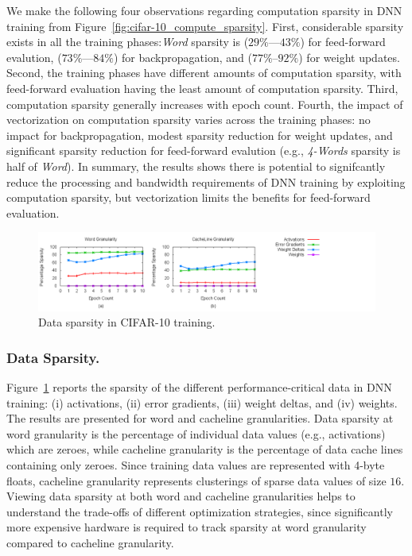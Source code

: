 We make the following four observations regarding computation sparsity in DNN training from Figure~\ref{fig:cifar-10_compute_sparsity}.  First, considerable sparsity exists in all the training phases:{\it Word} sparsity is ($29\%$---$43\%$) for feed-forward evalution, ($73\%$---$84\%$) for backpropagation, and ($77\%$--$92\%$) for weight updates.   Second, the training phases have different amounts of computation sparsity, with feed-forward evaluation having the least amount of computation sparsity. Third, computation sparsity generally increases with epoch count.  Fourth, the impact of vectorization on computation sparsity varies across the training phases: no impact for backpropagation, modest sparsity reduction for weight updates, and significant sparsity reduction for feed-forward evalution (e.g., {\it 4-Words} sparsity is half of {\it Word}).  In summary, the results shows there is potential to signifcantly reduce the processing and bandwidth requirements of DNN training by exploiting computation sparsity, but vectorization limits the benefits for feed-forward evaluation. 
  
 \begin{figure}
 \centering
 \includegraphics[width=1.9\columnwidth]{Figures/multi_datasparsity.png}
\caption{Data sparsity in CIFAR-10 training.}
 \label{fig:cifar-10_data_sparsity}
 \end{figure}

\subsubsection{Data Sparsity.} 
Figure~\ref{fig:cifar-10_data_sparsity} reports the sparsity of the different performance-critical data in DNN training: (i) activations, (ii) error gradients, (iii) weight deltas, and (iv) weights.  The results are presented for word and cacheline granularities.  Data sparsity at word granularity is the percentage of individual data values (e.g., activations) which are zeroes, while cacheline granularity is the percentage of data cache lines containing only zeroes.  Since training data values are represented with 4-byte floats, cacheline granularity represents clusterings of sparse data values of size $16$.  Viewing data sparsity at both word and cacheline granularities helps to understand the trade-offs of different optimization strategies, since significantly more expensive hardware is required to track sparsity at word granularity compared to cacheline granularity.  

